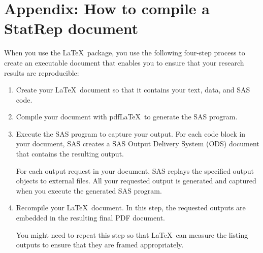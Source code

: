 \section{Appendix: How to compile a StatRep document\label{sec:statrep}}

When you use the \Statrep \LaTeX\ package, you use the following
four-step process to create an executable document that
enables you to ensure that your research results are reproducible:
\begin{enumerate}
\item Create your \LaTeX\ document so that it contains your text,
data, and SAS code.

\item Compile your document with pdf\LaTeX\ to generate the SAS
program.

\item Execute the SAS program to capture your output. For each
code block in your document, SAS creates a SAS Output Delivery System (ODS)
document that contains the resulting output.

For each output request in your document, SAS replays the
specified output objects to external files. All your
requested output is generated and captured when you execute
the generated SAS program.

\item Recompile your \LaTeX\ document. In this step, the
requested outputs are embedded in the resulting final PDF document.

You might need to repeat this step so that \LaTeX\ can measure the
listing outputs to ensure that they are framed appropriately.
\end{enumerate}
